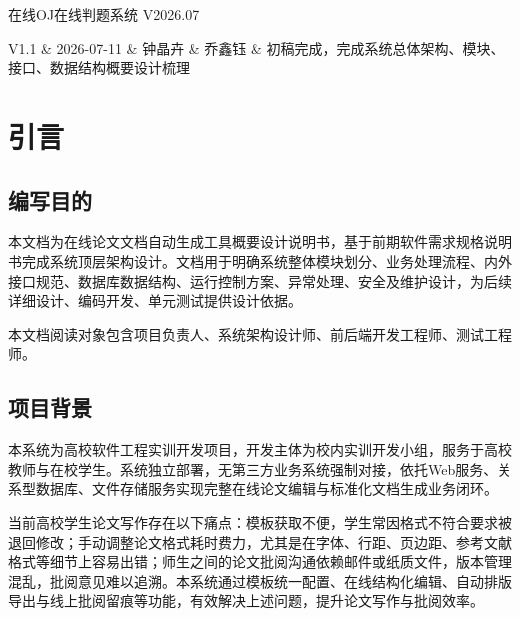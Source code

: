 \documentclass{../template/softeng}
\begin{document}
	
	{在线OJ在线判题系统}
	{V2026.07}
	
	\tableofcontents
	\newpage
	
	\begin{revrecord}
		V1.1 & 2026-07-11 & 钟晶卉 & 乔鑫钰 & 初稿完成，完成系统总体架构、模块、接口、数据结构概要设计梳理 \\
		\hline
		
	\end{revrecord}
	
\section{引言}

\subsection{编写目的}
本文档为在线论文文档自动生成工具概要设计说明书，基于前期软件需求规格说明书完成系统顶层架构设计。文档用于明确系统整体模块划分、业务处理流程、内外接口规范、数据库数据结构、运行控制方案、异常处理、安全及维护设计，为后续详细设计、编码开发、单元测试提供设计依据。

本文档阅读对象包含项目负责人、系统架构设计师、前后端开发工程师、测试工程师。

\subsection{项目背景}
本系统为高校软件工程实训开发项目，开发主体为校内实训开发小组，服务于高校教师与在校学生。系统独立部署，无第三方业务系统强制对接，依托Web服务、关系型数据库、文件存储服务实现完整在线论文编辑与标准化文档生成业务闭环。

当前高校学生论文写作存在以下痛点：模板获取不便，学生常因格式不符合要求被退回修改；手动调整论文格式耗时费力，尤其是在字体、行距、页边距、参考文献格式等细节上容易出错；师生之间的论文批阅沟通依赖邮件或纸质文件，版本管理混乱，批阅意见难以追溯。本系统通过模板统一配置、在线结构化编辑、自动排版导出与线上批阅留痕等功能，有效解决上述问题，提升论文写作与批阅效率。
\end{document}
